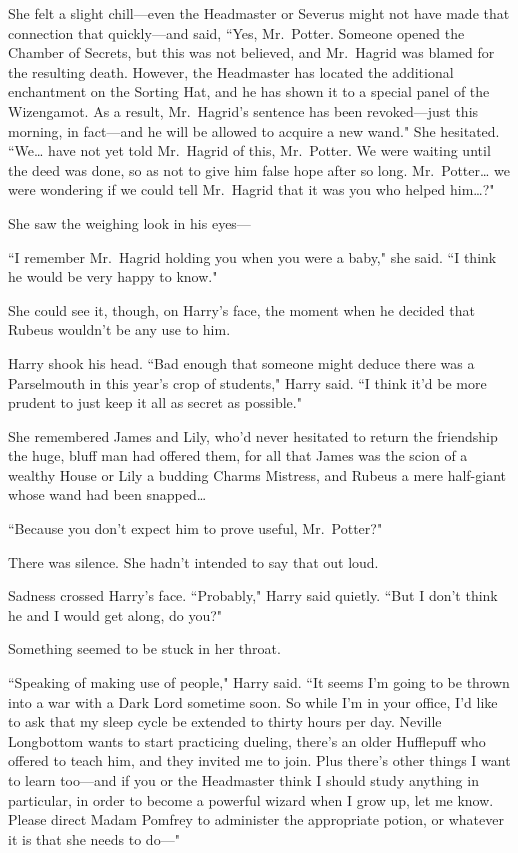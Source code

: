 She felt a slight chill---even the Headmaster or Severus might not have made that connection that quickly---and said, ``Yes, Mr.~Potter. Someone opened the Chamber of Secrets, but this was not believed, and Mr.~Hagrid was blamed for the resulting death. However, the Headmaster has located the additional enchantment on the Sorting Hat, and he has shown it to a special panel of the Wizengamot. As a result, Mr.~Hagrid's sentence has been revoked---just this morning, in fact---and he will be allowed to acquire a new wand." She hesitated. ``We{\ldots} have not yet told Mr.~Hagrid of this, Mr.~Potter. We were waiting until the deed was done, so as not to give him false hope after so long. Mr.~Potter{\ldots} we were wondering if we could tell Mr.~Hagrid that it was you who helped him{\ldots}?"

She saw the weighing look in his eyes---

``I remember Mr.~Hagrid holding you when you were a baby," she said. ``I think he would be very happy to know."

She could see it, though, on Harry's face, the moment when he decided that Rubeus wouldn't be any use to him.

Harry shook his head. ``Bad enough that someone might deduce there was a Parselmouth in this year's crop of students," Harry said. ``I think it'd be more prudent to just keep it all as secret as possible."

She remembered James and Lily, who'd never hesitated to return the friendship the huge, bluff man had offered them, for all that James was the scion of a wealthy House or Lily a budding Charms Mistress, and Rubeus a mere half-giant whose wand had been snapped{\ldots}

``Because you don't expect him to prove useful, Mr.~Potter?"

There was silence. She hadn't intended to say that out loud.

Sadness crossed Harry's face. ``Probably," Harry said quietly. ``But I don't think he and I would get along, do you?"

Something seemed to be stuck in her throat.

``Speaking of making use of people," Harry said. ``It seems I'm going to be thrown into a war with a Dark Lord sometime soon. So while I'm in your office, I'd like to ask that my sleep cycle be extended to thirty hours per day. Neville Longbottom wants to start practicing dueling, there's an older Hufflepuff who offered to teach him, and they invited me to join. Plus there's other things I want to learn too---and if you or the Headmaster think I should study anything in particular, in order to become a powerful wizard when I grow up, let me know. Please direct Madam Pomfrey to administer the appropriate potion, or whatever it is that she needs to do---"

